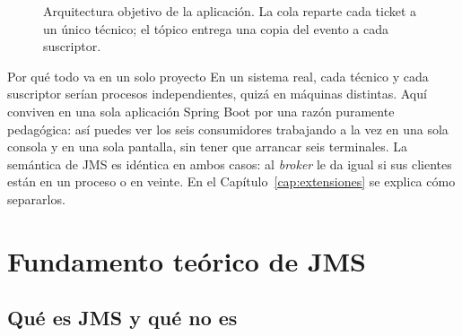 \documentclass[11pt,a4paper]{book}
\begin{document}
\begin{figure}[htbp]
{}
	\caption{Arquitectura objetivo de la aplicación. La cola reparte cada ticket a un único técnico; el tópico entrega una copia del evento a cada suscriptor.}
	\label{fig:arquitectura}
\end{figure}

\begin{cajaTip}{Por qué todo va en un solo proyecto}
	En un sistema real, cada técnico y cada suscriptor serían procesos independientes, quizá en máquinas distintas.
	Aquí conviven en una sola aplicación Spring Boot por una razón puramente pedagógica: así puedes ver los seis consumidores trabajando a la vez en una sola consola y en una sola pantalla, sin tener que arrancar seis terminales.
	La semántica de JMS es idéntica en ambos casos: al \emph{broker} le da igual si sus clientes están en un proceso o en veinte.
	En el Capítulo~\ref{cap:extensiones} se explica cómo separarlos.
\end{cajaTip}

\part{Fundamento teórico de JMS}
\label{parte:teoria}

\chapter{Qué es JMS y qué no es}
\end{document}
